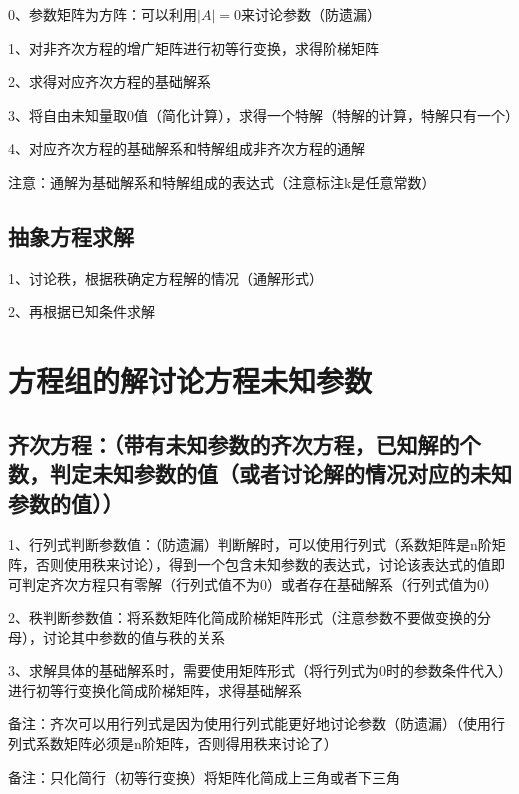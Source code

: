 0、参数矩阵为方阵：可以利用$|A| = 0$来讨论参数（防遗漏）

1、对非齐次方程的增广矩阵进行初等行变换，求得阶梯矩阵

2、求得对应齐次方程的基础解系

3、将自由未知量取0值（简化计算），求得一个特解（特解的计算，特解只有一个）

4、对应齐次方程的基础解系和特解组成非齐次方程的通解

注意：通解为基础解系和特解组成的表达式（注意标注k是任意常数）



\subsection{抽象方程求解}

1、讨论秩，根据秩确定方程解的情况（通解形式）

2、再根据已知条件求解

\section{方程组的解讨论方程未知参数}



\subsection{齐次方程：（带有未知参数的齐次方程，已知解的个数，判定未知参数的值（或者讨论解的情况对应的未知参数的值））}

1、行列式判断参数值：（防遗漏）判断解时，可以使用行列式（系数矩阵是n阶矩阵，否则使用秩来讨论），得到一个包含未知参数的表达式，讨论该表达式的值即可判定齐次方程只有零解（行列式值不为0）或者存在基础解系（行列式值为0）

2、秩判断参数值：将系数矩阵化简成阶梯矩阵形式（注意参数不要做变换的分母），讨论其中参数的值与秩的关系

3、求解具体的基础解系时，需要使用矩阵形式（将行列式为0时的参数条件代入）进行初等行变换化简成阶梯矩阵，求得基础解系

备注：齐次可以用行列式是因为使用行列式能更好地讨论参数（防遗漏）（使用行列式系数矩阵必须是n阶矩阵，否则得用秩来讨论了）

备注：只化简行（初等行变换）将矩阵化简成上三角或者下三角



